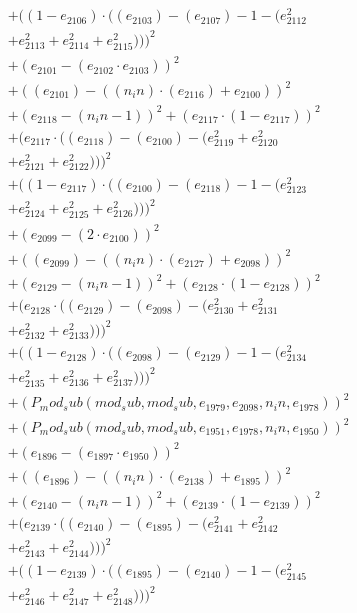 \documentclass[10pt, a4paper]{article}
\begin{document}
\begin{align*}
& + ((1 - e_{2106})  \cdot  ((e_{2103}) - (e_{2107}) - 1 - (e_{2112}^{2} \\
& + e_{2113}^{2} + e_{2114}^{2} + e_{2115}^{2})))^{2} \\
& + (e_{2101} - (e_{2102}  \cdot  e_{2103}))^{2} \\
& + ((e_{2101}) - ((n_in)  \cdot  (e_{2116}) + e_{2100}))^{2} \\
& + (e_{2118} - (n_in - 1))^{2} + (e_{2117}  \cdot  (1 - e_{2117}))^{2} \\
& + (e_{2117}  \cdot  ((e_{2118}) - (e_{2100}) - (e_{2119}^{2} + e_{2120}^{2} \\
& + e_{2121}^{2} + e_{2122}^{2})))^{2} \\
& + ((1 - e_{2117})  \cdot  ((e_{2100}) - (e_{2118}) - 1 - (e_{2123}^{2} \\
& + e_{2124}^{2} + e_{2125}^{2} + e_{2126}^{2})))^{2} \\
& + (e_{2099} - (2  \cdot  e_{2100}))^{2} \\
& + ((e_{2099}) - ((n_in)  \cdot  (e_{2127}) + e_{2098}))^{2} \\
& + (e_{2129} - (n_in - 1))^{2} + (e_{2128}  \cdot  (1 - e_{2128}))^{2} \\
& + (e_{2128}  \cdot  ((e_{2129}) - (e_{2098}) - (e_{2130}^{2} + e_{2131}^{2} \\
& + e_{2132}^{2} + e_{2133}^{2})))^{2} \\
& + ((1 - e_{2128})  \cdot  ((e_{2098}) - (e_{2129}) - 1 - (e_{2134}^{2} \\
& + e_{2135}^{2} + e_{2136}^{2} + e_{2137}^{2})))^{2} \\
& + (P_mod_sub(mod_sub, mod_sub, e_{1979}, e_{2098}, n_in, e_{1978}))^{2} \\
& + (P_mod_sub(mod_sub, mod_sub, e_{1951}, e_{1978}, n_in, e_{1950}))^{2} \\
& + (e_{1896} - (e_{1897}  \cdot  e_{1950}))^{2} \\
& + ((e_{1896}) - ((n_in)  \cdot  (e_{2138}) + e_{1895}))^{2} \\
& + (e_{2140} - (n_in - 1))^{2} + (e_{2139}  \cdot  (1 - e_{2139}))^{2} \\
& + (e_{2139}  \cdot  ((e_{2140}) - (e_{1895}) - (e_{2141}^{2} + e_{2142}^{2} \\
& + e_{2143}^{2} + e_{2144}^{2})))^{2} \\
& + ((1 - e_{2139})  \cdot  ((e_{1895}) - (e_{2140}) - 1 - (e_{2145}^{2} \\
& + e_{2146}^{2} + e_{2147}^{2} + e_{2148}^{2})))^{2} \\

\end{align*}
\end{document}
